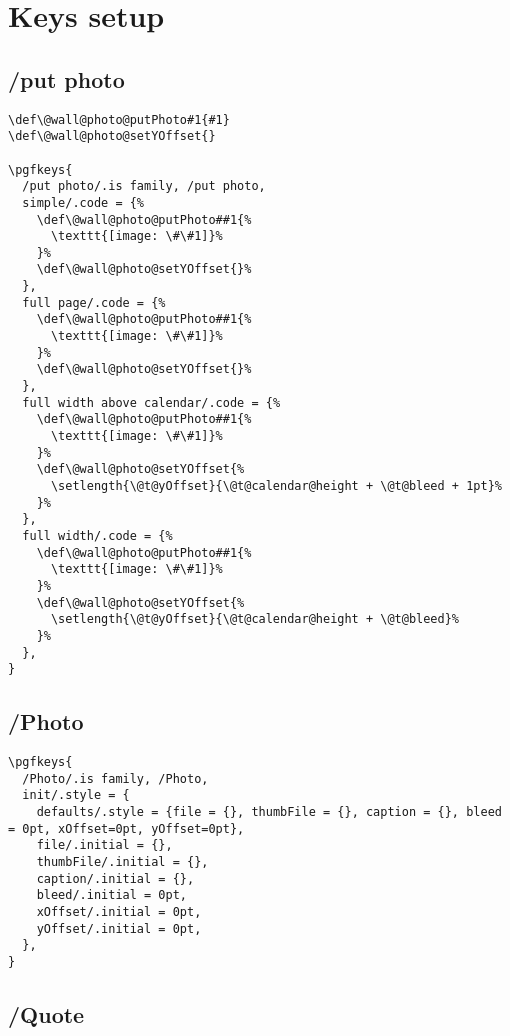 \documentclass[11pt,oneside]{memoir-article}
\begin{document}
\chapter{Keys setup}
\label{sec:orge5d42f4}
\section{/put photo}
\label{sec:org198eca9}

\begin{verbatim}
\def\@wall@photo@putPhoto#1{#1}
\def\@wall@photo@setYOffset{}

\pgfkeys{
  /put photo/.is family, /put photo,
  simple/.code = {%
    \def\@wall@photo@putPhoto##1{%
      \texttt{[image: \#\#1]}%
    }%
    \def\@wall@photo@setYOffset{}%
  },
  full page/.code = {%
    \def\@wall@photo@putPhoto##1{%
      \texttt{[image: \#\#1]}%
    }%
    \def\@wall@photo@setYOffset{}%
  },
  full width above calendar/.code = {%
    \def\@wall@photo@putPhoto##1{%
      \texttt{[image: \#\#1]}%
    }%
    \def\@wall@photo@setYOffset{%
      \setlength{\@t@yOffset}{\@t@calendar@height + \@t@bleed + 1pt}%
    }%
  },
  full width/.code = {%
    \def\@wall@photo@putPhoto##1{%
      \texttt{[image: \#\#1]}%
    }%
    \def\@wall@photo@setYOffset{%
      \setlength{\@t@yOffset}{\@t@calendar@height + \@t@bleed}%
    }%
  },
}
\end{verbatim}

\section{/Photo}
\label{sec:orgbfbfe40}

\begin{verbatim}
\pgfkeys{
  /Photo/.is family, /Photo,
  init/.style = {
    defaults/.style = {file = {}, thumbFile = {}, caption = {}, bleed = 0pt, xOffset=0pt, yOffset=0pt},
    file/.initial = {},
    thumbFile/.initial = {},
    caption/.initial = {},
    bleed/.initial = 0pt,
    xOffset/.initial = 0pt,
    yOffset/.initial = 0pt,
  },
}
\end{verbatim}

\section{/Quote}
\label{sec:orgfc6858a}
\end{document}

